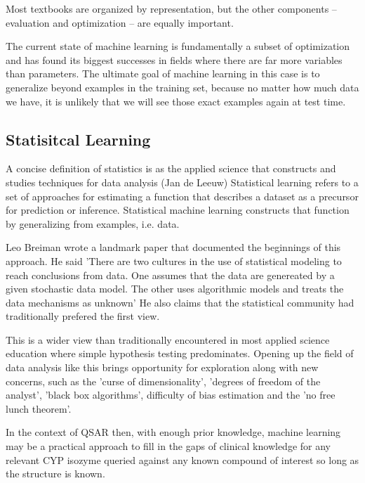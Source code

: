 Most textbooks are organized by representation, but the other components -- evaluation and optimization -- are equally important.\cite{Domingos2012}

The current state of machine learning is fundamentally a subset of optimization and has found its biggest successes in fields where there are far more variables than parameters. The ultimate goal of machine learning in this case is to generalize beyond examples in the training set, because no matter how much data we have, it is unlikely that we will see those exact examples again at test time.\cite{Domingos2012} 



\subsection{Statisitcal Learning}

A concise definition of statistics is as the applied science that constructs and studies techniques for data analysis (Jan de Leeuw) Statistical learning refers to a set of approaches for estimating a function that describes a dataset as a precursor for prediction or inference.\cite{James2013} Statistical machine learning constructs that function by generalizing from examples, i.e. data.

Leo Breiman wrote a landmark paper that documented the beginnings of this approach. He said 'There are two cultures in the use of statistical modeling to reach conclusions from data. One assumes that the data are genereated by a given stochastic data model. The other uses algorithmic models and treats the data mechanisms as unknown' \cite{Breiman2001} He also claims that the statistical community had traditionally prefered the first view. 

This is a wider view than traditionally encountered in most applied science education where simple hypothesis testing predominates. Opening up the field of data analysis like this brings opportunity for exploration along with new concerns, such as the 'curse of dimensionality', 'degrees of freedom of the analyst', 'black box algorithms', difficulty of bias estimation and the 'no free lunch theorem'.\cite{Boulesteix2014}

In the context of QSAR then, with enough prior knowledge, machine learning may be a practical approach to fill in the gaps of clinical knowledge for any relevant CYP isozyme queried against any known compound of interest so long as the structure is known.


